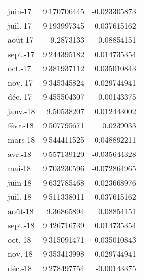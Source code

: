 \begin{tabular}{@{}lrr@{}}
    juin-17                  & 9.170706445                       & -0.023305873                      \\
    juil.-17                 & 9.193997345                       & 0.037615162                       \\
    août-17                  & 9.2873133                         & 0.08854151                        \\
    sept.-17                 & 9.244395182                       & 0.014735354                       \\
    oct.-17                  & 9.381937112                       & 0.035010843                       \\
    nov.-17                  & 9.345345824                       & -0.029744941                      \\
    déc.-17                  & 9.455504307                       & -0.00143375                       \\
    janv.-18                 & 9.50538207                        & 0.012443002                       \\
    févr.-18                 & 9.507795671                       & 0.0239033                         \\
    mars-18                  & 9.544411525                       & -0.048892211                      \\
    avr.-18                  & 9.557139129                       & -0.035644328                      \\
    mai-18                   & 9.703230596                       & -0.072864965                      \\
    juin-18                  & 9.632785468                       & -0.023668976                      \\
    juil.-18                 & 9.511338011                       & 0.037615162                       \\
    août-18                  & 9.36865894                        & 0.08854151                        \\
    sept.-18                 & 9.426716739                       & 0.014735354                       \\
    oct.-18                  & 9.315091471                       & 0.035010843                       \\
    nov.-18                  & 9.353413998                       & -0.029744941                      \\
    déc.-18                  & 9.278497754                       & -0.00143375                       \\

\end{tabular}
